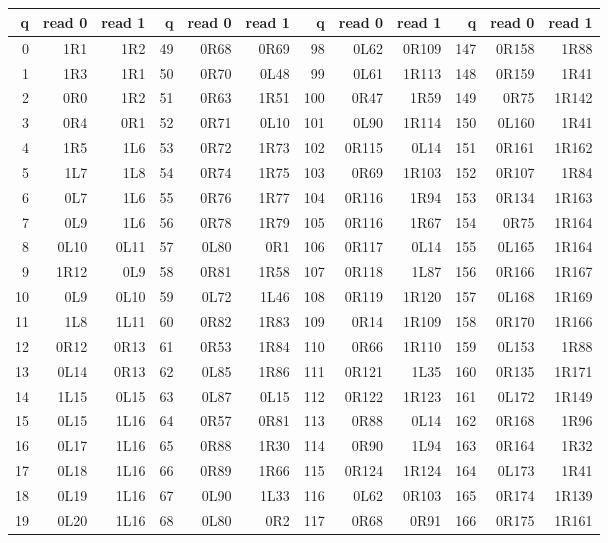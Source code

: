 \subsection{\texorpdfstring{}{PA194H5X\_MF}}
\begingroup\fontsize{8.4}{9.6}\selectfont\ttfamily
\setlength{\tabcolsep}{4pt}\renewcommand{\arraystretch}{1.0}
\begin{center}\begin{tabular}{rrr@{\hspace{13pt}}rrr@{\hspace{13pt}}rrr@{\hspace{13pt}}rrr}
\toprule q&read 0&read 1&q&read 0&read 1&q&read 0&read 1&q&read 0&read 1\\\midrule
0&1R1&1R2&49&0R68&0R69&98&0L62&0R109&147&0R158&1R88\\
1&1R3&1R1&50&0R70&0L48&99&0L61&1R113&148&0R159&1R41\\
2&0R0&1R2&51&0R63&1R51&100&0R47&1R59&149&0R75&1R142\\
3&0R4&0R1&52&0R71&0L10&101&0L90&1R114&150&0L160&1R41\\
4&1R5&1L6&53&0R72&1R73&102&0R115&0L14&151&0R161&1R162\\
5&1L7&1L8&54&0R74&1R75&103&0R69&1R103&152&0R107&1R84\\
6&0L7&1L6&55&0R76&1R77&104&0R116&1R94&153&0R134&1R163\\
7&0L9&1L6&56&0R78&1R79&105&0R116&1R67&154&0R75&1R164\\
8&0L10&0L11&57&0L80&0R1&106&0R117&0L14&155&0L165&1R164\\
9&1R12&0L9&58&0R81&1R58&107&0R118&1L87&156&0R166&1R167\\
10&0L9&0L10&59&0L72&1L46&108&0R119&1R120&157&0L168&1R169\\
11&1L8&1L11&60&0R82&1R83&109&0R14&1R109&158&0R170&1R166\\
12&0R12&0R13&61&0R53&1R84&110&0R66&1R110&159&0L153&1R88\\
13&0L14&0R13&62&0L85&1R86&111&0R121&1L35&160&0R135&1R171\\
14&1L15&0L15&63&0L87&0L15&112&0R122&1R123&161&0L172&1R149\\
15&0L15&1L16&64&0R57&0R81&113&0R88&0L14&162&0R168&1R96\\
16&0L17&1L16&65&0R88&1R30&114&0R90&1L94&163&0R164&1R32\\
17&0L18&1L16&66&0R89&1R66&115&0R124&1R124&164&0L173&1R41\\
18&0L19&1L16&67&0L90&1L33&116&0L62&0R103&165&0R174&1R139\\
19&0L20&1L16&68&0L80&0R2&117&0R68&0R91&166&0R175&1R161\\

\end{tabular}
\end{center}

